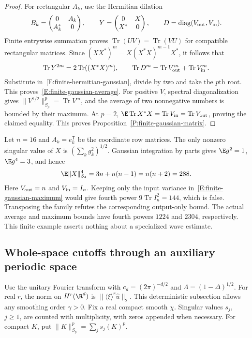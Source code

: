 \begin{proof}
  For rectangular $A_k$, use the Hermitian dilation
  \[
    B_k=\begin{pmatrix}0&A_k\\A_k^*&0\end{pmatrix},\qquad
    Y=\begin{pmatrix}0&X\\X^*&0\end{pmatrix},\qquad
    D=\operatorname{diag}(V_{\rm out},V_{\rm in}).
  \]
  Finite entrywise summation proves $\operatorname{Tr}(UV)=\operatorname{Tr}(VU)$
  for compatible rectangular matrices. Since
  $(XX^*)^m=X(X^*X)^{m-1}X^*$, it follows that
  \[
    \operatorname{Tr}Y^{2m}=2\operatorname{Tr}((X^*X)^m),\qquad
    \operatorname{Tr}D^m=\operatorname{Tr}V_{\rm out}^m+
    \operatorname{Tr}V_{\rm in}^m.
  \]
  Substitute in~\eqref{E:finite-hermitian-gaussian}, divide by two and
  take the $p$th root. This proves~\eqref{E:finite-gaussian-average}.
  For positive $V$, spectral diagonalization gives
  $\|V^{1/2}\|_{S_p}^p=\operatorname{Tr}V^m$, and the average of two
  nonnegative numbers is bounded by their maximum. At $p=2$,
  $\E\operatorname{Tr}X^*X=\operatorname{Tr}V_{\rm in}
  =\operatorname{Tr}V_{\rm out}$, proving the claimed equality.
  This proves Proposition~\ref{P:finite-gaussian-matrix}.
\end{proof}

\begin{remark}
  \label{R:gaussian-one-variance-test}
  Let $n=16$ and $A_k=e_k^{\mathsf T}$ be the coordinate row matrices.
  The only nonzero singular value of $X$ is $(\sum_k g_k^2)^{1/2}$.
  Gaussian integration by parts gives $\E g^2=1$, $\E g^4=3$, and hence
  \[
    \E\|X\|_{S_4}^4=3n+n(n-1)=n(n+2)=288.
  \]
  Here $V_{\rm out}=n$ and $V_{\rm in}=I_n$. Keeping only the input
  variance in~\eqref{E:finite-gaussian-maximum} would give fourth power
  $9\operatorname{Tr}I_n^2=144$, which is false. Transposing the family
  refutes the corresponding output-only bound. The actual average and
  maximum bounds have fourth powers $1224$ and $2304$, respectively.
  This finite example asserts nothing about a specialized wave estimate.
\end{remark}

\subsection{Whole-space cutoffs through an auxiliary periodic space}

Use the unitary Fourier transform with $c_d=(2\pi)^{-d/2}$ and
$\Lambda=(1-\Delta)^{1/2}$. For real $r$, the norm on $H^r(\R^d)$ is
$\|\langle\xi\rangle^r\widehat u\|_2$. This deterministic subsection
allows any smoothing order $\gamma > 0$. Fix a real compact smooth $\chi$.
Singular values $s_j$, $j \ge 1$, are counted with multiplicity, with zeros
appended when necessary. For compact $K$, put
$\|K\|_{S_p}^p=\sum_j s_j(K)^p$.

